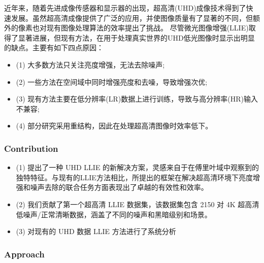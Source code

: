 \documentclass[letterpaper,10pt]{article}
\begin{document}
	近年来，随着先进成像传感器和显示器的出现，超高清(UHD)成像技术得到了快速发展。虽然超高清成像提供了广泛的应用，并使图像质量有了显著的不同，但额外的像素也对现有图像处理算法的效率提出了挑战。
	尽管微光图像增强(LLIE)取得了显著进展，但现有方法，在用于处理真实世界的UHD低光图像时显示出明显的缺点。主要有如下四点原因：
	
	\begin{itemize}
		\item {}
			(1) 大多数方法只关注亮度增强，无法去除噪声;
		\item {}
			(2) 一些方法在空间域中同时增强亮度和去噪，导致增强次优;
		\item {}
			(3) 现有方法主要在低分辨率(LR)数据上进行训练，导致与高分辨率(HR)输入不兼容;
		\item {}
			(4) 部分研究采用重结构，因此在处理超高清图像时效率低下。
	\end{itemize}
		
	\subsubsection{Contribution}

	\begin{itemize}
		\item {}
			(1) 提出了一种 UHD LLIE 的新解决方案，灵感来自于在傅里叶域中观察到的独特特征。与现有的LLIE方法相比，所提出的框架在解决超高清环境下亮度增强和噪声去除的联合任务方面表现出了卓越的有效性和效率。
		\item {}
			(2) 我们贡献了第一个超高清 LLIE 数据集，该数据集包含 2150 对 4K 超高清低噪声/正常清晰数据，涵盖了不同的噪声和黑暗级别和场景。
		\item {}
			(3) 对现有的 UHD 数据 LLIE 方法进行了系统分析
	\end{itemize}
	
	\subsubsection{Approach}
	
\end{document}

